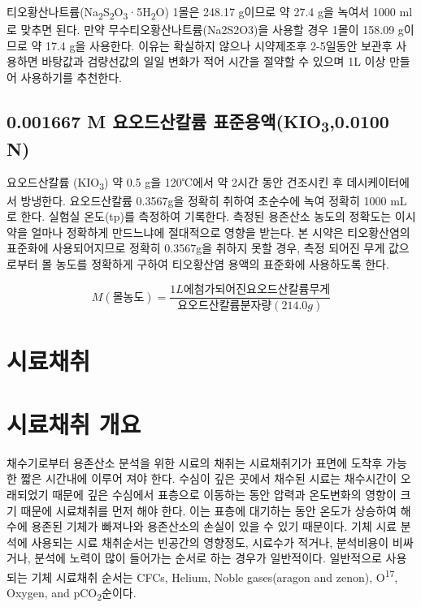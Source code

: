 \documentclass[
]{book}
\begin{document}
티오황산나트륨(Na\textsubscript{2}S\textsubscript{2}O\textsubscript{3}·5H\textsubscript{2}O) 1몰은 248.17 g이므로 약 27.4 g을 녹여서 1000 ml로 맞추면 된다. 만약 무수티오황산나트륨(Na2S2O3)을 사용할 경우 1몰이 158.09 g이므로 약 17.4 g을 사용한다. 이유는 확실하지 않으나 시약제조후 2-5일동안 보관후 사용하면 바탕값과 검량선값의 일일 변화가 적어 시간을 절약할 수 있으며 1L 이상 만들어 사용하기를 추천한다.

\hypertarget{m-uxc694uxc624uxb4dcuxc0b0uxce7cuxb968-uxd45cuxc900uxc6a9uxc561kio30.0100-n}{%
\subsection{\texorpdfstring{0.001667 M 요오드산칼륨 표준용액(KIO\textsubscript{3},0.0100 N)}{0.001667 M 요오드산칼륨 표준용액(KIO3,0.0100 N)}}\label{m-uxc694uxc624uxb4dcuxc0b0uxce7cuxb968-uxd45cuxc900uxc6a9uxc561kio30.0100-n}}

요오드산칼륨 (KIO\textsubscript{3}) 약 0.5 g을 120℃에서 약 2시간 동안 건조시킨 후 데시케이터에서 방냉한다. 요오드산칼륨 0.3567g을 정확히 취하여 초순수에 녹여 정확히 1000 mL로 한다. 실험실 온도(tp)를 측정하여 기록한다. 측정된 용존산소 농도의 정확도는 이시약을 얼마나 정확하게 만드느냐에 절대적으로 영향을 받는다. 본 시약은 티오황산염의 표준화에 사용되어지므로 정확히 0.3567g을 취하지 못할 경우, 측정 되어진 무게 값으로부터 몰 농도를 정확하게 구하여 티오황산염 용액의 표준화에 사용하도록 한다.

\[M (몰농도) =\frac{1L에 첨가되어진 요오드산칼륨 무게}{요오드산칼륨 분자량(214.0g)}\]

\hypertarget{uxc2dcuxb8ccuxcc44uxcde8-1}{%
\section{시료채취}\label{uxc2dcuxb8ccuxcc44uxcde8-1}}

\hypertarget{uxc2dcuxb8ccuxcc44uxcde8-uxac1cuxc694}{%
\section{시료채취 개요}\label{uxc2dcuxb8ccuxcc44uxcde8-uxac1cuxc694}}

채수기로부터 용존산소 분석을 위한 시료의 채취는 시료채취기가 표면에 도착후 가능한 짧은 시간내에 이루어 져야 한다. 수심이 깊은 곳에서 채수된 시료는 채수시간이 오래되었기 때문에 깊은 수심에서 표층으로 이동하는 동안 압력과 온도변화의 영향이 크기 때문에 시료채취를 먼저 해야 한다. 이는 표층에 대기하는 동안 온도가 상승하여 해수에 용존된 기체가 빠져나와 용존산소의 손실이 있을 수 있기 때문이다. 기체 시료 분석에 사용되는 시료 채취순서는 빈공간의 영향정도, 시료수가 적거나, 분석비용이 비싸거나, 분석에 노력이 많이 들어가는 순서로 하는 경우가 일반적이다. 일반적으로 사용되는 기체 시료채취 순서는 CFCs, Helium, Noble gases(aragon and zenon), O\textsuperscript{17}, Oxygen, and pCO\textsubscript{2}순이다.
\end{document}
